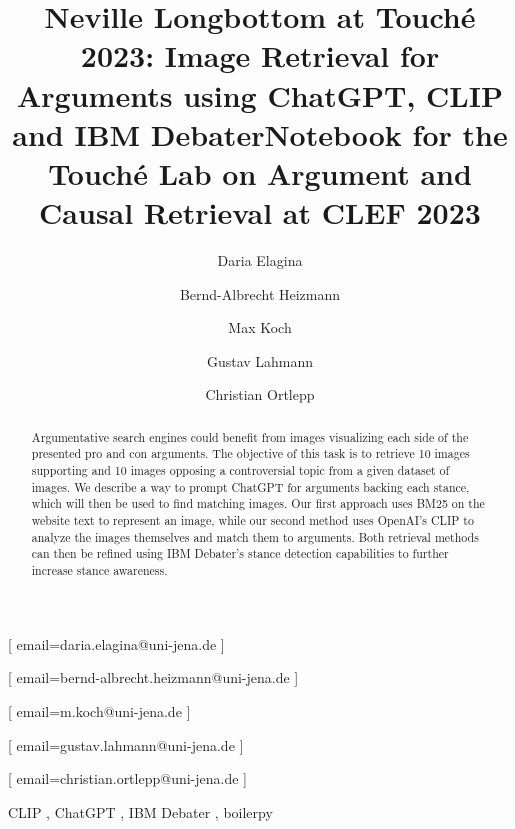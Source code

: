 \documentclass[
]{ceurart}
\begin{document}


\title{Neville Longbottom at Touch\'e 2023: Image Retrieval for Arguments using ChatGPT, CLIP and IBM Debater}
\title[mode=sub]{Notebook for the Touch{\'e} Lab on Argument and Causal Retrieval at CLEF 2023}


\author[1]{Daria Elagina}[%
email=daria.elagina@uni-jena.de
]
\author[1]{Bernd-Albrecht Heizmann}[%
email=bernd-albrecht.heizmann@uni-jena.de
]
\author[1]{Max Koch}[%
email=m.koch@uni-jena.de
]
\author[1]{Gustav Lahmann}[%
email=gustav.lahmann@uni-jena.de
]
\author[1]{Christian Ortlepp}[%
email=christian.ortlepp@uni-jena.de
]


\address[1]{Friedrich-Schiller University Jena,
07743, Jena}


\begin{abstract}
Argumentative search engines could benefit from images visualizing each side of the presented pro and con arguments. The objective of this task is to retrieve 10 images supporting and 10 images opposing a controversial topic from a given dataset of images. We describe a way to prompt ChatGPT for arguments backing each stance, which will then be used to find matching images. Our first approach uses BM25 on the website text to represent an image, while our second method uses OpenAI's CLIP to analyze the images themselves and match them to arguments. Both retrieval methods can then be refined using IBM Debater's stance detection capabilities to further increase stance awareness.
\end{abstract}

\begin{keywords}
  CLIP \sep
  ChatGPT \sep
  IBM Debater \sep
	boilerpy
\end{keywords}
\end{document}
